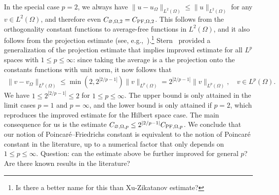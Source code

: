 \documentclass[a4paper]{article}
\begin{document}
In the special case $p=2$, we always have $\| u - u_\Omega \|_{L^{2}(\Omega)} \leq \| u \|_{L^{2}(\Omega)}$ for any $v \in L^{2}(\Omega)$,
and therefore even $C_{\varnothing,\Omega,2} = C_{{\rm PF},\Omega,2}$. 
This follows from the orthogonality constant functions to average-free functions in $L^2(\Omega)$,
and it also follows from the projection estimate (see, e.g.,~\cite{xu2003some}).\footnote{\color{red}Is there a better name for this than Xu-Zikatanov estimate?}
Stern~\cite{stern2015banach} provided a generalization of the projection estimate that implies improved estimate for all $L^p$ spaces with $1 \leq p \leq \infty$:
since taking the average is a the projection onto the constants functions with unit norm, it now follows that 
\begin{align*}
    \| v - v_\Omega \|_{L^{p}(\Omega)}
    \leq 
    \min\left( 2, 2^{|2/p-1|} \right)
    \| v \|_{L^{p}(\Omega)}
    = 
    2^{|2/p-1|} 
    \| v \|_{L^{p}(\Omega)}
    ,
    \quad 
    v \in L^p(\Omega)
    .
\end{align*}
We have $1 \leq 2^{|2/p-1|} \leq 2$ for $1 \leq p \leq \infty$.
The upper bound is only attained in the limit cases $p = 1$ and $p = \infty$, and the lower bound is only attained if $p = 2$, which reproduces the improved estimate for the Hilbert space case.
The main consequence for us is the estimate 
$C_{\varnothing,\Omega,p} \leq 2^{|2/p-1|} C_{{\rm PF},\Omega,p}$.
We conclude that our notion of Poincar\'e--Friedrichs constant is equivalent to the notion of Poincar\'e constant in the literature, up to a numerical factor that only depends on $1 \leq p \leq \infty$.
\color{red} Question: can the estimate above be further improved for general $p$? Are there known results in the literature? \color{black}
\end{document}
